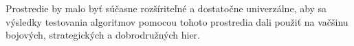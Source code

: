 \indent Prostredie by malo byť súčasne rozšíriteľné a dostatočne univerzálne, aby sa výsledky testovania algoritmov pomocou tohoto prostredia dali použiť na vačšinu bojových, strategických a dobrodružných hier. \\
